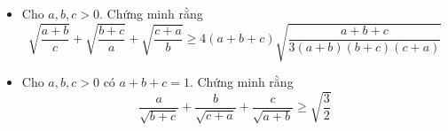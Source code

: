 \documentclass[11pt]{scrartcl}
\begin{document}
\begin{itemize}[label=, leftmargin=0em, itemsep=-0em]
        \item\begin{btvn}
            Cho $a,b,c > 0$. Chứng minh rằng
            \[\sqrt{\frac{a + b}{c}} + \sqrt{\frac{b + c}{a}} + \sqrt{\frac{c + a}{b}} \geq 4(a +b + c)\sqrt{\frac{a + b + c}{3(a + b)(b + c)(c + a)}}
            \]
        \end{btvn}

            \item\begin{btvn}
                Cho $a,b,c > 0$ có $a + b + c = 1$. Chứng minh rằng
                \[
                    \frac{a}{\sqrt{b + c}} + \frac{b}{\sqrt{c + a}} + \frac{c}{\sqrt{a + b}} \geq \sqrt{\frac{3}{2}}
                \]
            \end{btvn}

\end{itemize}
\end{document}
